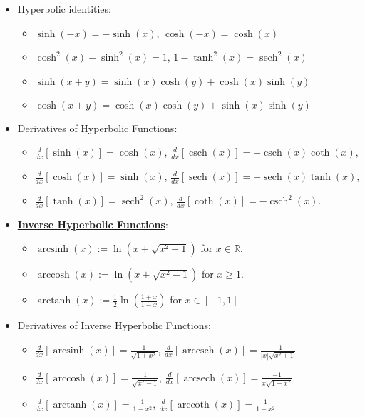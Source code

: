 \documentclass[11pt]{article}
\newcommand{\dfn}[1]{\underline{\textbf{#1}}}
\newcommand{\R}[0]{\mathbb{R}}
\newcommand{\deriv}[1]{\frac{d}{dx} \left[ #1 \right]}
\DeclareMathOperator{\csch}{csch}
\DeclareMathOperator{\sech}{sech}
\DeclareMathOperator{\arcsinh}{arcsinh}
\DeclareMathOperator{\arccosh}{arccosh}
\DeclareMathOperator{\arctanh}{arctanh}
\DeclareMathOperator{\arcsech}{arcsech}
\DeclareMathOperator{\arccsch}{arccsch}
\DeclareMathOperator{\arccoth}{arccoth}
\begin{document}
\begin{itemize}[noitemsep]
\begin{itemize}[noitemsep]
		\item Hyperbolic identities: 
		\begin{itemize}
			\item $\sinh(-x) = - \sinh(x)$, $\cosh(-x) = \cosh(x)$ 
			\item $\cosh^2(x)  - \sinh^2(x) = 1$, $1- \tanh^2(x) = \sech^2(x)$ 
			\item $\sinh(x+y) = \sinh(x) \cosh(y) + \cosh(x) \sinh(y)$
			\item $\cosh(x+y) = \cosh(x) \cosh(y) + \sinh(x) \sinh(y)$
		\end{itemize}
		\item Derivatives of Hyperbolic Functions: 
		\begin{itemize}[noitemsep]
			\item $\deriv{\sinh(x)} = \cosh(x)$, $\deriv{\csch(x)} = - \csch(x) \coth(x)$, 
			\item $\deriv{\cosh(x)} = \sinh(x)$, $\deriv{\sech(x)} = - \sech(x) \tanh(x)$, 
			\item $\deriv{\tanh(x)} = \sech^2(x)$, $\deriv{\coth(x)} = - \csch^2(x)$. 
		\end{itemize}
		\item \dfn{Inverse Hyperbolic Functions}: 
		\begin{itemize}[noitemsep]
			\item $\arcsinh(x) := \ln(x + \sqrt{x^2 + 1})$ for $x \in \R$. 
			\item $\arccosh(x) := \ln ( x + \sqrt{x^2 -1})$ for $x \geq 1$. 
			\item $\arctanh(x) := \frac{1}{2} \ln \left( \frac{1+x}{1-x} \right)$ for $x \in [-1, 1]$ 
		\end{itemize}
		\item Derivatives of Inverse Hyperbolic Functions: 
		\begin{itemize}[noitemsep]
			\item $\deriv{\arcsinh(x)} = \frac{1}{\sqrt{1+x^2}}$, $\deriv{ \arccsch(x)} = \frac{-1}{|x| \sqrt{x^2 +1}}$
			\item $\deriv{\arccosh(x)} = \frac{1}{\sqrt{x^2 - 1}}$, $\deriv{\arcsech(x)} = \frac{-1}{x \sqrt{1-x^2}}$
			\item $\deriv{\arctanh(x)} = \frac{1}{1-x^2}$, $\deriv{ \arccoth(x) } = \frac{1}{1-x^2}$
		\end{itemize}	
	\end{itemize}
\end{itemize}
\end{document}
